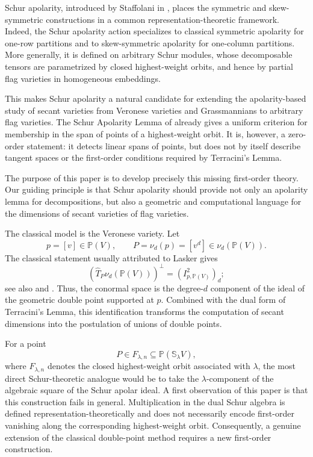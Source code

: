 \documentclass[a4paper,reqno]{amsart}
\theoremstyle{plainnopunct}
\theoremstyle{definitionnopunct}
\renewcommand{\P}{\mathbb{P}}
\renewcommand{\S}{\mathbb{S}}
\begin{document}
Schur apolarity, introduced by Staffolani in
\cite{StaffolaniThesis,Staffolani2023}, places the symmetric and
skew-symmetric constructions in a common representation-theoretic
framework. Indeed, the Schur apolarity action specializes to
classical symmetric apolarity for one-row partitions and to
skew-symmetric apolarity for one-column partitions. More generally,
it is defined on arbitrary Schur modules, whose decomposable tensors
are parametrized by closed highest-weight orbits, and hence by partial
flag varieties in homogeneous embeddings.

This makes Schur apolarity a natural candidate for extending the
apolarity-based study of secant varieties from Veronese varieties and
Grassmannians to arbitrary flag varieties. The Schur Apolarity Lemma
of \cite{Staffolani2023} already gives a uniform criterion for
membership in the span of points of a highest-weight orbit. It is,
however, a zero-order statement: it detects linear spans of points,
but does not by itself describe tangent spaces or the first-order
conditions required by Terracini's Lemma.

The purpose of this paper is to develop precisely this missing
first-order theory. Our guiding principle is that Schur apolarity
should provide not only an apolarity lemma for decompositions, but
also a geometric and computational language for the dimensions of
secant varieties of flag varieties.

The classical model is the Veronese variety. Let
\[
p=[v]\in\P(V),
\qquad
P=\nu_d(p)=[v^d]\in\nu_d(\P(V)).
\]
The classical statement usually attributed to Lasker
\cite{Lasker1904} gives
\[
\left(
\widehat T_P\nu_d(\P(V))
\right)^\perp
=
\left(
I_{p,\P(V)}^2
\right)_d;
\]
see also
\cite[Proposition~2.1]{BrambillaOttaviani2008} and
\cite{Ottaviani2013}. Thus, the conormal space is the degree-$d$
component of the ideal of the geometric double point supported at
$p$. Combined with the dual form of Terracini's Lemma, this
identification transforms the computation of secant dimensions into
the postulation of unions of double points.

For a point
\[
P\in F_{\lambda,n}
\subseteq
\P(\S_\lambda V),
\]
where $F_{\lambda,n}$ denotes the closed highest-weight orbit
associated with $\lambda$, the most direct Schur-theoretic analogue would be to take the $\lambda$-component of the algebraic square of the Schur apolar ideal.
A first observation of this paper is that this construction fails in
general. Multiplication in the dual Schur algebra is defined
representation-theoretically and does not necessarily encode
first-order vanishing along the corresponding highest-weight orbit.
Consequently, a genuine extension of the classical double-point
method requires a new first-order construction.
\end{document}
